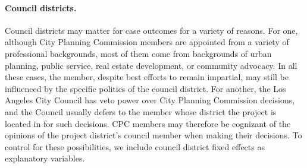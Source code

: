 \paragraph{Council districts.} Council districts may matter for case outcomes for a variety of reasons. For one, although City Planning Commission members are appointed from a variety of professional backgrounds, most of them come from backgrounds of urban planning, public service, real estate development, or community advocacy. In all these cases, the member, despite best efforts to remain impartial, may still be influenced by the specific politics of the council district. For another, the Los Angeles City Council has veto power over City Planning Commission decisions, and the Council usually defers to the member whose district the project is located in for such decisions. CPC members may therefore be cognizant of the opinions of the project district's council member when making their decisions. To control for these possibilities, we include council district fixed effects as explanatory variables.

